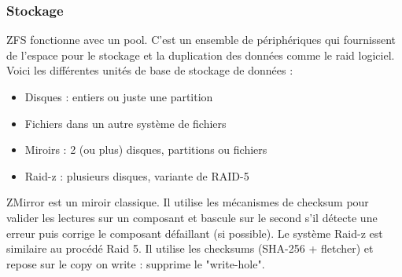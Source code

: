 \documentclass[a4paper,11pt]{report}
\begin{document}
	\subsubsection{Stockage}
	ZFS fonctionne avec un pool. C'est un ensemble de périphériques qui fournissent de l’espace pour le stockage et la duplication des données comme le raid logiciel. \\
	Voici les différentes unités de base de stockage de données :\\
	\begin{itemize}
		 \item Disques : entiers ou juste une partition
		 \item Fichiers dans un autre système de fichiers
		 \item Miroirs : 2 (ou plus) disques, partitions ou fichiers
		 \item Raid-z : plusieurs disques, variante de RAID-5\\
	\end{itemize}
	ZMirror est un miroir classique. Il utilise les mécanismes de checksum pour valider les lectures sur un composant et bascule sur le second s'il détecte une erreur puis corrige le composant défaillant (si possible). Le système Raid-z est similaire au procédé Raid 5. Il utilise les checksums (SHA-256 + fletcher) et repose sur le copy on write : supprime le "write-hole".
\end{document}
